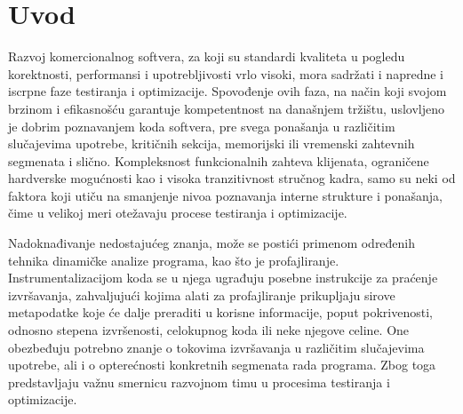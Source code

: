 \documentclass[12pt,oneside]{memoir}
\begin{document}
\frontmatter
\naslovna
\komisija
\apstrakt
\tableofcontents

\mainmatter

\chapter{Uvod}

Razvoj komercionalnog softvera, za koji su standardi kvaliteta u pogledu korektnosti, performansi i upotrebljivosti vrlo visoki, mora sadržati i napredne i iscrpne faze testiranja i optimizacije. Spovođenje ovih faza, na način koji svojom brzinom i efikasnošću garantuje kompetentnost na današnjem tržištu, uslovljeno je dobrim poznavanjem koda softvera, pre svega ponašanja u različitim slučajevima upotrebe, kritičnih sekcija, memorijski ili vremenski zahtevnih segmenata i slično. Kompleksnost funkcionalnih zahteva  klijenata, ograničene hardverske mogućnosti kao i visoka tranzitivnost stručnog kadra, samo su neki od faktora koji utiču na smanjenje nivoa poznavanja interne strukture i ponašanja, čime u velikoj meri otežavaju procese testiranja i optimizacije.

Nadoknađivanje nedostajućeg znanja, može se postići primenom određenih tehnika dinamičke analize programa, kao što je profajliranje. Instrumentalizacijom koda se u njega ugrađuju posebne instrukcije za praćenje izvršavanja, zahvaljujući kojima alati za profajliranje prikupljaju sirove metapodatke koje će dalje preraditi u korisne informacije, poput pokrivenosti, odnosno stepena izvršenosti, celokupnog koda ili neke njegove celine. One obezbeđuju potrebno znanje o tokovima izvršavanja u različitim slučajevima upotrebe, ali i o opterećnosti konkretnih segmenata rada programa. Zbog toga predstavljaju važnu smernicu razvojnom timu u procesima testiranja i optimizacije.
\end{document}

